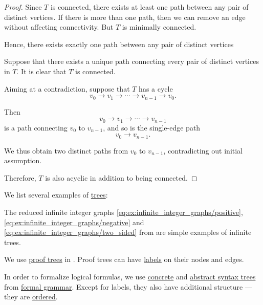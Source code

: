 \begin{proof}
  Since \( T \) is connected, there exists at least one path between any pair of distinct vertices. If there is more than one path, then we can remove an edge without affecting connectivity. But \( T \) is minimally connected.

  Hence, there exists exactly one path between any pair of distinct vertices

   Suppose that there exists a unique path connecting every pair of distinct vertices in \( T \). It is clear that \( T \) is connected.

  Aiming at a contradiction, suppose that \( T \) has a cycle
  \begin{equation*}
    v_0 \to v_1 \to \cdots \to v_{n-1} \to v_0.
  \end{equation*}

  Then
  \begin{equation*}
    v_0 \to v_1 \to \cdots \to v_{n-1}
  \end{equation*}
  is a path connecting \( v_0 \) to \( v_{n-1} \), and so is the single-edge path
  \begin{equation*}
    v_0 \to v_{n-1}.
  \end{equation*}

  We thus obtain two distinct paths from \( v_0 \) to \( v_{n-1} \), contradicting out initial assumption.

  Therefore, \( T \) is also acyclic in addition to being connected.
\end{proof}

\begin{example}\label{ex:def:tree}
  We list several examples of \hyperref[def:tree]{trees}:
  \begin{thmenum}
     The reduced infinite integer graphs \eqref{eq:ex:infinite_integer_graphs/positive}, \eqref{eq:ex:infinite_integer_graphs/negative} and \eqref{eq:ex:infinite_integer_graphs/two_sided} from  are simple examples of infinite trees.

     We use \hyperref[def:natural_deduction_proof_tree]{proof trees} in . Proof trees can have \hyperref[def:labeled_set]{labels} on their nodes and edges.

     In order to formalize logical formulas, we use \hyperref[def:parse_tree]{concrete} and \hyperref[con:abstract_syntax_tree]{abstract syntax trees} from \hyperref[def:formal_grammar]{formal grammar}. Except for labels, they also have additional structure --- they are \hyperref[def:ordered_tree]{ordered}.
  \end{thmenum}
\end{example}

